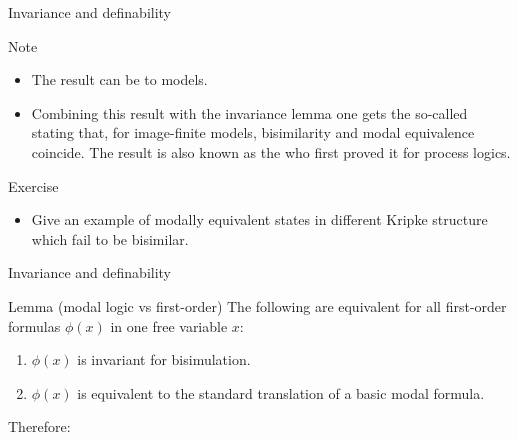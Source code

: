 \documentclass{beamer}
\begin{document}
\begin{slide}{Invariance and definability}\label{s:34}
\small
\begin{block}{Note}
\begin{itemize}
\item The result can be  to  models.
\item Combining this result with the invariance lemma one gets the so-called  stating that, for image-finite models, bisimilarity and modal equivalence coincide. The result is also known as the  who first proved it for process logics.
\end{itemize}
\end{block}

\begin{exampleblock}{Exercise}
\begin{itemize}
\item Give an example of modally equivalent states in different Kripke structure which fail to be bisimilar.
\end{itemize}
\end{exampleblock}
\end{slide}


\begin{slide}{Invariance and definability}\label{s:35}
\small

\begin{block}{Lemma (modal logic vs first-order)}
The following are equivalent for all first-order formulas $\phi(x)$ in one free variable $x$:
\begin{enumerate}
\item $\phi(x)$ is invariant for bisimulation.
\item $\phi(x)$ is equivalent to the standard translation of a basic modal formula.
 \end{enumerate}
  \end{block}
  
 Therefore:\\
\end{slide}
\end{document}
